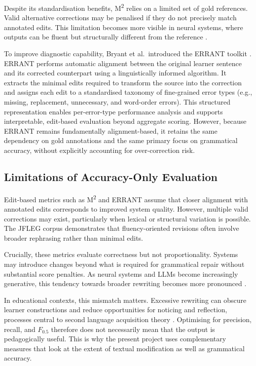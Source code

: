 Despite its standardisation benefits, M\textsuperscript{2} relies on a limited set of gold references. Valid alternative corrections may be penalised if they do not precisely match annotated edits. This limitation becomes more visible in neural systems, where outputs can be fluent but structurally different from the reference \cite{napoles-etal-2017-jfleg}.

To improve diagnostic capability, Bryant et al.\ introduced the ERRANT toolkit \cite{bryant-etal-2017-automatic}. ERRANT performs automatic alignment between the original learner sentence and its corrected counterpart using a linguistically informed algorithm. It extracts the minimal edits required to transform the source into the correction and assigns each edit to a standardised taxonomy of fine-grained error types (e.g., missing, replacement, unnecessary, and word-order errors). This structured representation enables per-error-type performance analysis and supports interpretable, edit-based evaluation beyond aggregate scoring. However, because ERRANT remains fundamentally alignment-based, it retains the same dependency on gold annotations and the same primary focus on grammatical accuracy, without explicitly accounting for over-correction risk.

\subsection{Limitations of Accuracy-Only Evaluation}

Edit-based metrics such as M\textsuperscript{2} and ERRANT assume that closer alignment with annotated edits corresponds to improved system quality. However, multiple valid corrections may exist, particularly when lexical or structural variation is possible. The JFLEG corpus \cite{napoles-etal-2017-jfleg} demonstrates that fluency-oriented revisions often involve broader rephrasing rather than minimal edits.

Crucially, these metrics evaluate correctness but not proportionality. Systems may introduce changes beyond what is required for grammatical repair without substantial score penalties. As neural systems and LLMs become increasingly generative, this tendency towards broader rewriting becomes more pronounced \cite{loem2023exploringeffectivenessgpt3grammatical}.

In educational contexts, this mismatch matters. Excessive rewriting can obscure learner constructions and reduce opportunities for noticing and reflection, processes central to second language acquisition theory \cite{schmidt1990role}. Optimising for precision, recall, and $F_{0.5}$ therefore does not necessarily mean that the output is pedagogically useful. This is why the present project uses complementary measures that look at the extent of textual modification as well as grammatical accuracy.

